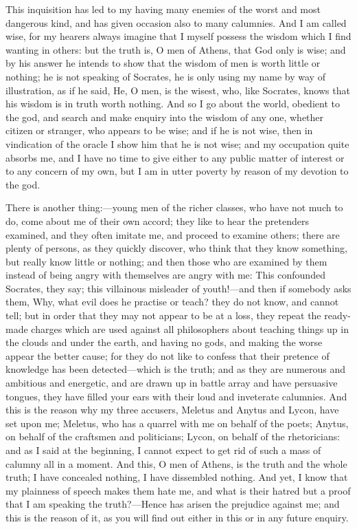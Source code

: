 \documentclass[11pt,letter]{article}
\begin{document}
\par  This inquisition has led to my having many enemies of the worst and most dangerous kind, and has given occasion also to many calumnies. And I am called wise, for my hearers always imagine that I myself possess the wisdom which I find wanting in others: but the truth is, O men of Athens, that God only is wise; and by his answer he intends to show that the wisdom of men is worth little or nothing; he is not speaking of Socrates, he is only using my name by way of illustration, as if he said, He, O men, is the wisest, who, like Socrates, knows that his wisdom is in truth worth nothing. And so I go about the world, obedient to the god, and search and make enquiry into the wisdom of any one, whether citizen or stranger, who appears to be wise; and if he is not wise, then in vindication of the oracle I show him that he is not wise; and my occupation quite absorbs me, and I have no time to give either to any public matter of interest or to any concern of my own, but I am in utter poverty by reason of my devotion to the god.

\par  There is another thing:—young men of the richer classes, who have not much to do, come about me of their own accord; they like to hear the pretenders examined, and they often imitate me, and proceed to examine others; there are plenty of persons, as they quickly discover, who think that they know something, but really know little or nothing; and then those who are examined by them instead of being angry with themselves are angry with me: This confounded Socrates, they say; this villainous misleader of youth!—and then if somebody asks them, Why, what evil does he practise or teach? they do not know, and cannot tell; but in order that they may not appear to be at a loss, they repeat the ready-made charges which are used against all philosophers about teaching things up in the clouds and under the earth, and having no gods, and making the worse appear the better cause; for they do not like to confess that their pretence of knowledge has been detected—which is the truth; and as they are numerous and ambitious and energetic, and are drawn up in battle array and have persuasive tongues, they have filled your ears with their loud and inveterate calumnies. And this is the reason why my three accusers, Meletus and Anytus and Lycon, have set upon me; Meletus, who has a quarrel with me on behalf of the poets; Anytus, on behalf of the craftsmen and politicians; Lycon, on behalf of the rhetoricians: and as I said at the beginning, I cannot expect to get rid of such a mass of calumny all in a moment. And this, O men of Athens, is the truth and the whole truth; I have concealed nothing, I have dissembled nothing. And yet, I know that my plainness of speech makes them hate me, and what is their hatred but a proof that I am speaking the truth?—Hence has arisen the prejudice against me; and this is the reason of it, as you will find out either in this or in any future enquiry.
\end{document}
